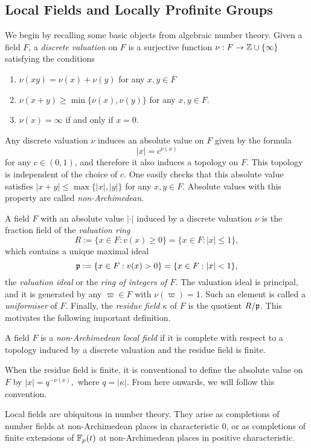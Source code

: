 

\subsection{Local Fields and Locally Profinite Groups}
We begin by recalling some basic objects from algebraic number theory. Given a field $F$, a \textit{discrete valuation} on $F$ is a surjective function $\nu: F\to\mathbb{Z}\cup\{\infty\}$ satisfying the conditions

\begin{enumerate}
    \item $\nu(xy)=\nu(x)+\nu(y)$ for any $x,y\in F$ 
    \item $\nu(x+y)\geq\min\{\nu(x),\nu(y)\}$ for any $x,y\in F$.
    \item $\nu(x)=\infty$ if and only if $x=0$.
\end{enumerate}

Any discrete valuation $\nu$ induces an absolute value on $F$ given by the formula 
$$|x|=c^{\nu(x)}$$ 
for any $c\in(0,1)$, and therefore it also induces a topology on $F$. This topology is independent of the choice of $c$. One easily checks that this absolute value satisfies $|x+y|\leq\max\{|x|,|y|\}$ for any $x,y\in F$. Absolute values with this property are called \textit{non-Archimedean}. 

A field $F$ with an absolute value $|\cdot|$ induced by a discrete valuation $\nu$ is the fraction field of the \textit{valuation ring}
$$R:=\{x\in F:v(x)\geq 0\}=\{x\in F: |x|\leq1\},$$ 
which contains a unique maximal ideal
$$\mathfrak{p}:=\{x\in F:v(x)> 0\}=\{x\in F: |x|<1\},$$
the \textit{valuation ideal} or the \textit{ring of integers of $F$}. The valuation ideal is principal, and it is generated by any $\varpi\in F$ with $\nu(\varpi)=1$. Such an element is called a \textit{uniformiser} of $F$. Finally, the \textit{residue field} $\kappa$ of $F$ is the quotient $R/\mathfrak{p}$. This motivates the following important definition.

\begin{defn}
    A field $F$ is a \textit{non-Archimedean local field} if it is complete with respect to a topology induced by a discrete valuation and the residue field is finite.
\end{defn}

\begin{rem}
    When the residue field is finite, it is conventional to define the absolute value on $F$ by 
    $|x|=q^{-\nu(x)},$
    where $q=|\kappa|$. From here onwards, we will follow this convention.
\end{rem}
\begin{rem}
    Local fields are ubiquitous in number theory. They arise as completions of number fields at non-Archimedean places in characteristic 0, or as completions of finite extensions of $\mathbb{F}_p(t)$ at non-Archimedean places in positive characteristic.
\end{rem}

